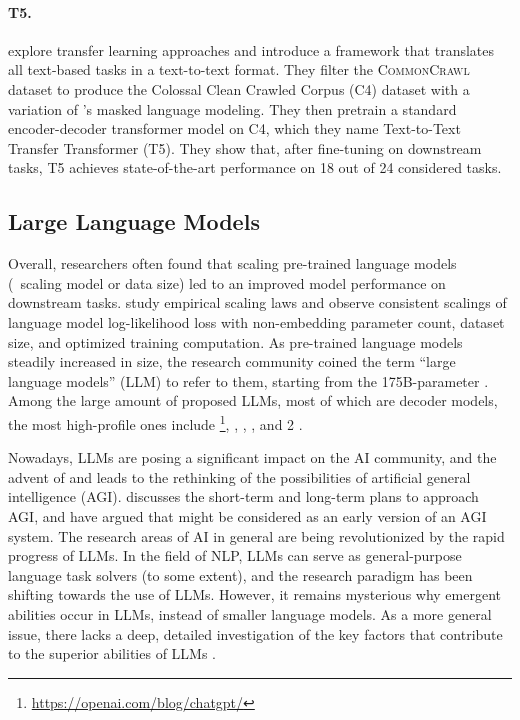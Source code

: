 \paragraph{T5.}
\citet{raffel2020exploring} explore transfer learning approaches and introduce a framework that translates all text-based {\nlp} tasks in a text-to-text format. They filter the \textsc{CommonCrawl} dataset to produce the Colossal Clean Crawled Corpus (C4) dataset with a variation of {\bert}'s masked language modeling. They then pretrain a standard encoder-decoder transformer model on C4, which they name Text-to-Text Transfer Transformer (T5). They show that, after fine-tuning on downstream tasks, T5 achieves state-of-the-art performance on 18 out of 24 considered tasks.

\subsection{Large Language Models} 
\label{sub:large_language_models}

Overall, researchers often found that scaling pre-trained language models ({\eg}\ scaling model or data size) led to an improved model performance on downstream tasks. \citet{kaplan2020scaling} study empirical scaling laws and observe consistent scalings of language model log-likelihood loss with non-embedding parameter count, dataset size, and optimized training computation. As pre-trained language models steadily increased in size, the research community coined the term ``large language models'' (LLM) to refer to them, starting from the 175B-parameter {\gptthree} \citep{brown2020language}. Among the large amount of proposed LLMs, most of which are decoder models, the most high-profile ones include \chatgpt\footnote{\url{https://openai.com/blog/chatgpt/}}, {\lamda} \citep{thoppilan2022lamda}, {\instructgpt} \citep{ouyang2022training}, {\palm} \citep{chowdhery2022palm}, {\gptfour} \citep{achiam2023gpt} and {\llama}2 \citep{touvron2023llama2}. 

Nowadays, LLMs are posing a significant impact on the AI community, and the advent of {\chatgpt} and {\gptfour} leads to the rethinking of the possibilities of artificial general intelligence (AGI). \citet{altman2023planning} discusses the short-term and long-term plans to approach AGI, and \citet{bubeck2023sparks} have argued that {\gptfour} might be considered as an early version of an AGI system. The research areas of AI in general are being revolutionized by the rapid progress of LLMs. In the field of NLP, LLMs can serve as general-purpose language task solvers (to some extent), and the research paradigm has been shifting towards the use of LLMs. However, it remains mysterious why emergent abilities occur in LLMs, instead of smaller language models. As a more general issue, there lacks a deep, detailed investigation of the key factors that contribute to the superior abilities of LLMs \citep{wei2022emergent}.

